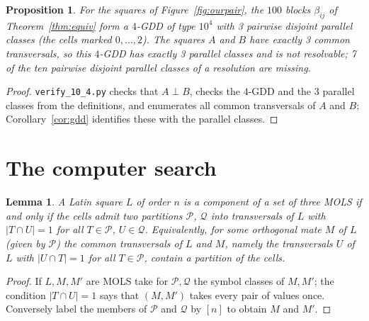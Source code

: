 \documentclass[11pt]{article}
\newtheorem{proposition}[theorem]{Proposition}
\newtheorem{lemma}[theorem]{Lemma}
\theoremstyle{remark}
\begin{document}
\begin{proposition}\label{prop:ourpair}
For the squares of Figure~\ref{fig:ourpair}, the $100$ blocks $\beta_{ij}$ of
Theorem~\ref{thm:equiv} form a $4$-GDD of type $10^{4}$ with 3 pairwise disjoint parallel
classes (the cells marked $0,\dots,2$).  The squares $A$ and $B$ have exactly
3 common transversals, so this $4$-GDD has exactly 3 parallel classes and is not
resolvable; 7 of the ten pairwise disjoint parallel classes of a resolution are
missing.
\end{proposition}

\begin{proof}
\texttt{verify\_10\_4.py} checks that $A\perp B$, checks the $4$-GDD and the 3 parallel
classes from the definitions, and enumerates all common transversals of $A$ and $B$;
Corollary~\ref{cor:gdd} identifies these with the parallel classes.
\end{proof}



\section{The computer search}\label{sec:search}

\begin{lemma}\label{lem:crit}
A Latin square $L$ of order $n$ is a component of a set of three MOLS if and only if the
cells admit two partitions $\mathcal P$, $\mathcal Q$ into transversals of $L$ with
$|T\cap U|=1$ for all $T\in\mathcal P$, $U\in\mathcal Q$.  Equivalently, for some orthogonal
mate $M$ of $L$ (given by $\mathcal P$) the common transversals of $L$ and $M$, namely the
transversals $U$ of $L$ with $|U\cap T|=1$ for all $T\in\mathcal P$, contain a partition of
the cells.
\end{lemma}

\begin{proof}
If $L,M,M'$ are MOLS take for $\mathcal P,\mathcal Q$ the symbol classes of $M,M'$; the
condition $|T\cap U|=1$ says that $(M,M')$ takes every pair of values once.  Conversely
label the members of $\mathcal P$ and $\mathcal Q$ by $[n]$ to obtain $M$ and $M'$.
\end{proof}
\end{document}
